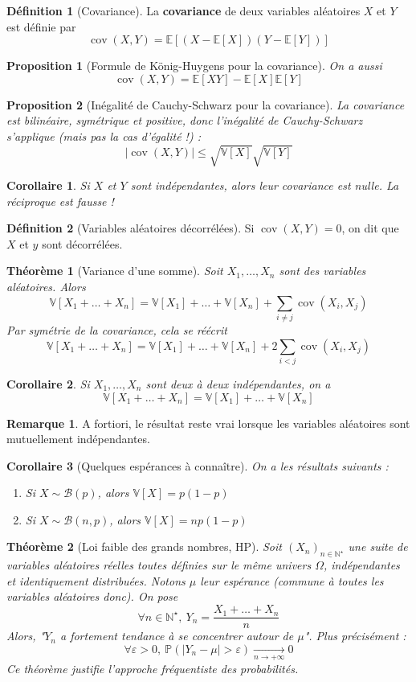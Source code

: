 \documentclass[french]{book}
\renewcommand{\P}{\mathbb{P}}
\newcommand{\N}{\mathbb{N}}
\newcommand{\E}{\mathbb{E}}
\newcommand{\V}{\mathbb{V}}
\newcommand{\st}{^\star}
\theoremstyle{plain}
\newtheorem{thm}{Théorème}[chapter]
\newtheorem{prop}{Proposition}[chapter]
\newtheorem{cor}{Corollaire}[chapter]
\theoremstyle{definition}
\newtheorem{dfn}{Définition}[chapter]
\newtheorem{rmq}{Remarque}[chapter]
\theoremstyle{remark}
\DeclareMathOperator{\cov}{cov}
\begin{document}
\begin{dfn}[Covariance]
	La \textbf{covariance} de deux variables aléatoires $X$ et $Y$ est définie par $$\cov(X,Y)=\E\left[(X-\E[X])(Y-\E[Y])\right]$$
\end{dfn}
\begin{prop}[Formule de König-Huygens pour la covariance]
	On a aussi $$\cov(X,Y)=\E[XY]-\E[X]\E[Y]$$
\end{prop}
\begin{prop}[Inégalité de Cauchy-Schwarz pour la covariance]
	La covariance est bilinéaire, symétrique et positive, donc l'inégalité de Cauchy-Schwarz s'applique (mais pas la cas d'égalité !) : $$\lvert\cov(X,Y)\rvert \leqslant\sqrt{\V[X]}\sqrt{\V[Y]}$$ 
\end{prop}
\begin{cor}
	Si $X$ et $Y$ sont indépendantes, alors leur covariance est nulle. La réciproque est fausse !
\end{cor}
\begin{dfn}[Variables aléatoires décorrélées]
	Si $\cov(X,Y)=0$, on dit que $X$ et $y$ sont décorrélées.
\end{dfn}
\begin{thm}[Variance d'une somme]
	Soit $X_1,\ldots,X_n$ sont des variables aléatoires. Alors $$\V[X_1+\ldots+X_n]=\V[X_1]+\ldots+\V[X_n]+\sum_{i\ne j} \cov(X_i,X_j)$$ Par symétrie de la covariance, cela se réécrit $$\V[X_1+\ldots+X_n]=\V[X_1]+\ldots+\V[X_n]+2\sum_{i<j} \cov(X_i,X_j)$$
\end{thm}
\begin{cor}
	Si $X_1,\ldots,X_n$ sont deux à deux indépendantes, on a $$\V[X_1+\ldots+X_n]=\V[X_1]+\ldots+\V[X_n]$$
\end{cor}
\begin{rmq} A fortiori, le résultat reste vrai lorsque les variables aléatoires sont mutuellement indépendantes. \end{rmq}
\begin{cor}[Quelques espérances à connaître]
	On a les résultats suivants :
	\begin{enumerate}
		\item Si $X\sim \mathcal{B}(p)$, alors $\V[X]=p(1-p)$
		\item Si $X\sim \mathcal{B}(n,p)$, alors $\V[X]=np(1-p)$
	\end{enumerate}
\end{cor}
\begin{thm}[Loi faible des grands nombres, HP]
	Soit $(X_n)_{n\in\N\st}$ une suite de variables aléatoires réelles toutes définies sur le même univers $\Omega$, indépendantes et identiquement distribuées. Notons $\mu$ leur espérance (commune à toutes les variables aléatoires donc). On pose $$\forall n\in\N\st,\ Y_n=\frac{X_1+\ldots+X_n}{n}$$ Alors, "$Y_n$ a fortement tendance à se concentrer autour de $\mu$". Plus précisément : $$\forall \varepsilon >0,\ \P(\lvert Y_n-\mu\rvert >\varepsilon)\xrightarrow[n\to+\infty]{}0$$ Ce théorème justifie l'approche fréquentiste des probabilités.
\end{thm}
\end{document}
